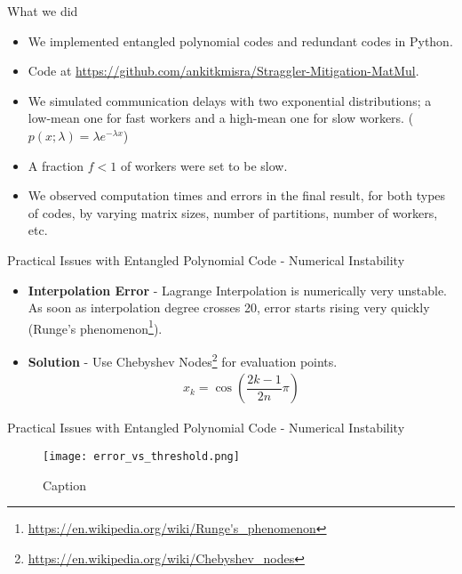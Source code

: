 \documentclass{beamer}
\begin{document}
\begin{frame}{What we did}
    \begin{itemize}
        \item We implemented entangled polynomial codes and redundant codes in Python.
        \item Code at \url{https://github.com/ankitkmisra/Straggler-Mitigation-MatMul}.
        \item We simulated communication delays with two exponential distributions; a low-mean one for fast workers and a high-mean one for slow workers. ($p(x;\lambda) = \lambda e^{-\lambda x}$)
        \item A fraction $f < 1$ of workers were set to be slow.
        \item We observed computation times and errors in the final result, for both types of codes, by varying matrix sizes, number of partitions, number of workers, etc.
    \end{itemize}
\end{frame}

\begin{frame}{Practical Issues with Entangled Polynomial Code - Numerical Instability}
    \begin{itemize}
        \item \textbf{Interpolation Error} - Lagrange Interpolation is numerically very unstable. As soon as interpolation degree crosses 20, error starts rising very quickly (Runge's phenomenon\footnote{\url{https://en.wikipedia.org/wiki/Runge's_phenomenon}}).
        \item \textbf{Solution} - Use Chebyshev Nodes\footnote{\url{https://en.wikipedia.org/wiki/Chebyshev_nodes}} for evaluation points. 
        \begin{align*}
            x_k = \cos\left(\dfrac{2k-1}{2n}\pi\right)
        \end{align*}
    \end{itemize}
\end{frame}

\begin{frame}{Practical Issues with Entangled Polynomial Code - Numerical Instability}
    \begin{figure}[H]
        \centering
        \texttt{[image: error\_vs\_threshold.png]}
        \caption{Caption}
    \end{figure}
\end{frame}
\end{document}
